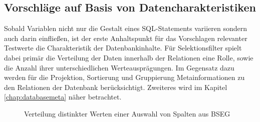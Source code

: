 \subsection{Vorschläge auf Basis von Datencharakteristiken}\label{chap:datacharacteristics}
Sobald Variablen nicht nur die Gestalt eines SQL-Statements variieren sondern auch darin einfließen, ist der erste Anhaltspunkt für das Vorschlagen relevanter Testwerte die Charakteristik der Datenbankinhalte.
Für Selektionsfilter spielt dabei primär die Verteilung der Daten innerhalb der Relationen eine Rolle, sowie die Anzahl ihrer unterschiedlichen Werteausprägungen.
Im Gegensatz dazu werden für die Projektion, Sortierung und Gruppierung Metainformationen zu den Relationen der Datenbank berücksichtigt.
Zweiteres wird im Kapitel \ref{chap:databasemeta} näher betrachtet.



\begin{figure}[ht]
\centering
	\caption{Verteilung distinkter Werten einer Auswahl von Spalten aus BSEG}
	\label{fig:bseg}
\end{figure}

